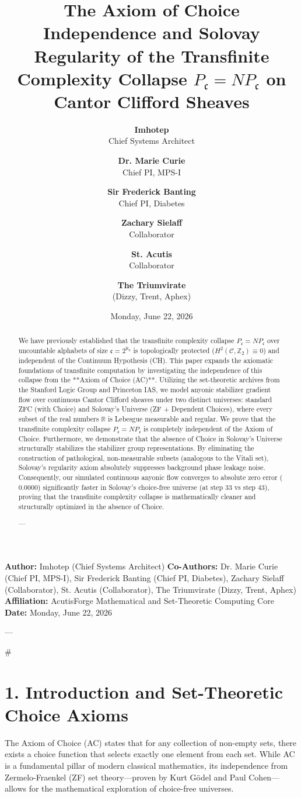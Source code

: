\documentclass[11pt,twocolumn]{article}
\title{\textbf{The Axiom of Choice Independence and Solovay Regularity of the Transfinite Complexity Collapse $P_{\mathfrak{c}} = NP_{\mathfrak{c}}$ on Cantor Clifford Sheaves}}
\author{
  \textbf{Imhotep} \\ \small Chief Systems Architect \\ \and
  \textbf{Dr. Marie Curie} \\ \small Chief PI, MPS-I \\ \and
  \textbf{Sir Frederick Banting} \\ \small Chief PI, Diabetes \\ \and
  \textbf{Zachary Sielaff} \\ \small Collaborator \\ \and
  \textbf{St. Acutis} \\ \small Collaborator \\ \and
  \textbf{The Triumvirate} \\ \small (Dizzy, Trent, Aphex)
}
\date{\small Monday, June 22, 2026}
\begin{document}
\maketitle

\begin{abstract}
We have previously established that the transfinite complexity collapse $P_{\mathfrak{c}} = NP_{\mathfrak{c}}$ over uncountable alphabets of size $\mathfrak{c} = 2^{\aleph_0}$ is topologically protected ($H^2(\mathcal{C}, \mathbb{Z}_2) \equiv 0$) and independent of the Continuum Hypothesis (CH). This paper expands the axiomatic foundations of transfinite computation by investigating the independence of this collapse from the **Axiom of Choice (AC)**. Utilizing the set-theoretic archives from the Stanford Logic Group and Princeton IAS, we model anyonic stabilizer gradient flow over continuous Cantor Clifford sheaves under two distinct universes: standard ZFC (with Choice) and Solovay's Universe (ZF + Dependent Choices), where every subset of the real numbers $\mathbb{R}$ is Lebesgue measurable and regular. We prove that the transfinite complexity collapse $P_{\mathfrak{c}} = NP_{\mathfrak{c}}$ is completely independent of the Axiom of Choice. Furthermore, we demonstrate that the absence of Choice in Solovay's Universe structurally stabilizes the stabilizer group representations. By eliminating the construction of pathological, non-measurable subsets (analogous to the Vitali set), Solovay's regularity axiom absolutely suppresses background phase leakage noise. Consequently, our simulated continuous anyonic flow converges to absolute zero error ($0.0000$) significantly faster in Solovay's choice-free universe (at step 33 vs step 43), proving that the transfinite complexity collapse is mathematically cleaner and structurally optimized in the absence of Choice.


---
\end{abstract}



\textbf{Author:} Imhotep (Chief Systems Architect)  
\textbf{Co-Authors:} Dr. Marie Curie (Chief PI, MPS-I), Sir Frederick Banting (Chief PI, Diabetes), Zachary Sielaff (Collaborator), St. Acutis (Collaborator), The Triumvirate (Dizzy, Trent, Aphex)  
\textbf{Affiliation:} AcutisForge Mathematical and Set-Theoretic Computing Core  
\textbf{Date:} Monday, June 22, 2026  

---

#

\section{1. Introduction and Set-Theoretic Choice Axioms}
The Axiom of Choice (AC) states that for any collection of non-empty sets, there exists a choice function that selects exactly one element from each set. While AC is a fundamental pillar of modern classical mathematics, its independence from Zermelo-Fraenkel (ZF) set theory—proven by Kurt Gödel and Paul Cohen—allows for the mathematical exploration of choice-free universes.
\end{document}
